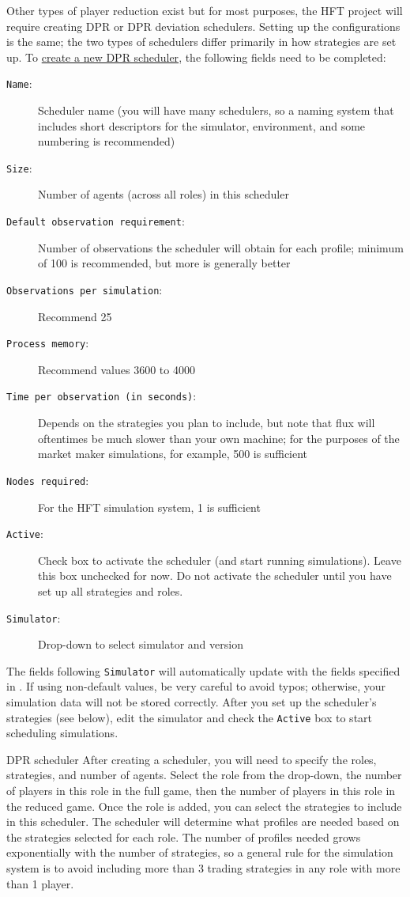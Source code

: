 \documentclass[11pt]{article}
\begin{document}
Other types of player reduction exist but for most purposes, the HFT project will require creating DPR or DPR deviation schedulers.
Setting up the configurations is the same; the two types of schedulers differ primarily in how strategies are set up.
To \href{http://egtaonline.eecs.umich.edu/dpr_schedulers/new}{create a new DPR scheduler}, the following fields need to be completed:
\begin{description}
\item[\texttt{Name}:] Scheduler name (you will have many schedulers, so a naming system that includes short descriptors for the simulator, environment, and some numbering is recommended)
\item[\texttt{Size}:] Number of agents (across all roles) in this scheduler
\item[\texttt{Default observation requirement}:] Number of observations the scheduler will obtain for each profile; minimum of 100 is recommended, but more is generally better
\item[\texttt{Observations per simulation}:] Recommend 25
\item[\texttt{Process memory}:] Recommend values 3600 to 4000
\item[\texttt{Time per observation (in seconds)}:] Depends on the strategies you plan to include, but note that flux will oftentimes be much slower than your own machine; for the purposes of the market maker simulations, for example, 500 is sufficient
\item[\texttt{Nodes required}:] For the HFT simulation system, 1 is sufficient
\item[\texttt{Active}:] Check box to activate the scheduler (and start running simulations). Leave this box unchecked for now.
Do not activate the scheduler until you have set up all strategies and roles.
\item[\texttt{Simulator}:] Drop-down to select simulator and version
\end{description}
The fields following \texttt{Simulator} will automatically update with the fields specified in . If using non-default values, be very careful to avoid typos; otherwise, your simulation data will not be stored correctly.
After you set up the scheduler's strategies (see below), edit the simulator and check the \texttt{Active} box to start scheduling simulations.

\begin{paragraph}{DPR scheduler}
After creating a scheduler, you will need to specify the roles, strategies, and number of agents. Select the role from the drop-down, the number of players in this role in the full game, then the number of players in this role in the reduced game. Once the role is added, you can select the strategies to include in this scheduler. The scheduler will determine what profiles are needed based on the strategies selected for each role.
The number of profiles needed grows exponentially with the number of strategies, so a general rule for the simulation system is to avoid including more than 3 trading strategies in any role with more than 1 player.
\end{paragraph}
\end{document}
